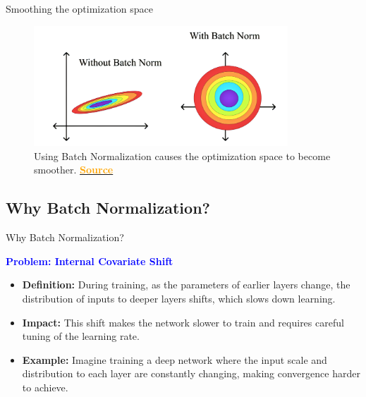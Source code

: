 \documentclass[serif, aspectratio=169]{beamer}
\begin{document}
\begin{frame}{Smoothing the optimization space}

        \begin{figure}
        \includegraphics[width=0.85\textwidth]{pic/BatchNorm_Effect.png}
        \caption{Using Batch Normalization causes the optimization space to become smoother. \href{https://www.linkedin.com/pulse/ways-improve-your-deep-learning-model-batch-adam-albuquerque-lima}{\textcolor{orange}{\textbf{Source}}}}
        \label{fig:BN_Effect1}
    \end{figure}

\end{frame}

\subsection{Why Batch Normalization?}

\begin{frame}{Why Batch Normalization?}

    \textcolor{blue}{\textbf{Problem: Internal Covariate Shift}}

\begin{itemize}

    \item \textbf{Definition:} During training, as the parameters of earlier layers change, the distribution of inputs to deeper layers shifts, which slows down learning.
    \item \textbf{Impact:} This shift makes the network slower to train and requires careful tuning of the learning rate.
    \item \textbf{Example:} Imagine training a deep network where the input scale and distribution to each layer are constantly changing, making convergence harder to achieve.

\end{itemize}

\end{frame}
\end{document}
